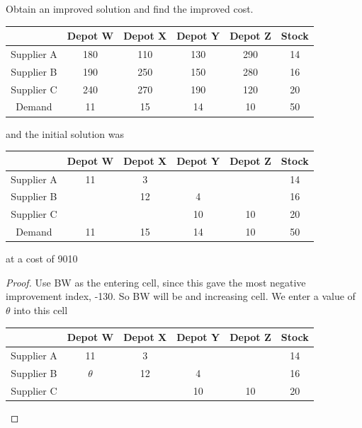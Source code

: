 \documentclass[a4paper]{article}
\begin{document}
\begin{eg}
	Obtain an improved solution and find the improved cost.
	\begin{center}
		\begin{tabular}{|c|c|c|c|c|c|}
			\hline
			           & Depot W & Depot X & Depot Y & Depot Z & Stock \\
			\hline
			Supplier A & 180     & 110     & 130     & 290     & 14    \\
			\hline
			Supplier B & 190     & 250     & 150     & 280     & 16    \\
			\hline
			Supplier C & 240     & 270     & 190     & 120     & 20    \\
			\hline
			Demand     & 11      & 15      & 14      & 10      & 50    \\
			\hline
		\end{tabular}
	\end{center}
	and the initial solution was
	\begin{center}
		\begin{tabular}{|c|c|c|c|c|c|}
			\hline
			           & Depot W & Depot X & Depot Y & Depot Z & Stock \\
			\hline
			Supplier A & 11      & 3       &         &         & 14    \\
			\hline
			Supplier B &         & 12      & 4       &         & 16    \\
			\hline
			Supplier C &         &         & 10      & 10      & 20    \\
			\hline
			Demand     & 11      & 15      & 14      & 10      & 50    \\
			\hline
		\end{tabular}
	\end{center}
	at a cost of 9010
	\begin{proof}
		Use BW as the entering cell, since this gave the most negative improvement index, -130. So BW will be and increasing cell. We enter a value of $\theta$ into this cell
		\begin{center}
			\begin{tabular}{|c|c|c|c|c|c|}
				\hline
				           & Depot W  & Depot X & Depot Y & Depot Z & Stock \\
				\hline
				Supplier A & 11       & 3       &         &         & 14    \\
				\hline
				Supplier B & $\theta$ & 12      & 4       &         & 16    \\
				\hline
				Supplier C &          &         & 10      & 10      & 20    \\

\end{tabular}
\end{center}
\end{proof}
\end{eg}
\end{document}
